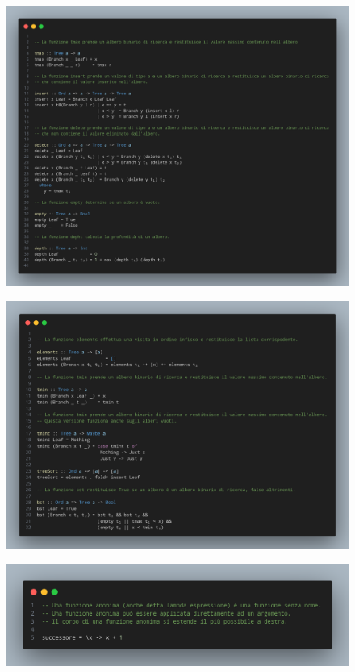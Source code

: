 \begin{figure}[!h]
    \centering
    \includegraphics[width=1\textwidth]{images/Tree-varie.png}
\end{figure}

\pagebreak

\begin{figure}[!h]
    \centering
    \includegraphics[width=1\textwidth]{images/Tree-varie2.png}
\end{figure}

\begin{figure}[!h]
    \centering
    \includegraphics[width=1\textwidth]{images/Funzioni anonime.png}
\end{figure}